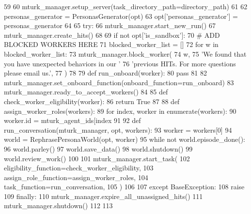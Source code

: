 \begin{DoxyCode}
59 
60     mturk\_manager.setup\_server(task\_directory\_path=directory\_path)
61 
62     personas\_generator = PersonasGenerator(opt)
63     opt[\textcolor{stringliteral}{'personas\_generator'}] = personas\_generator
64 
65     \textcolor{keywordflow}{try}:
66         mturk\_manager.start\_new\_run()
67         mturk\_manager.create\_hits()
68 
69         \textcolor{keywordflow}{if} \textcolor{keywordflow}{not} opt[\textcolor{stringliteral}{'is\_sandbox'}]:
70             \textcolor{comment}{# ADD BLOCKED WORKERS HERE}
71             blocked\_worker\_list = []
72             \textcolor{keywordflow}{for} w \textcolor{keywordflow}{in} blocked\_worker\_list:
73                 mturk\_manager.block\_worker(
74                     w,
75                     \textcolor{stringliteral}{'We found that you have unexpected behaviors in our '}
76                     \textcolor{stringliteral}{'previous HITs. For more questions please email us.'},
77                 )
78 
79         \textcolor{keyword}{def }run\_onboard(worker):
80             \textcolor{keywordflow}{pass}
81 
82         mturk\_manager.set\_onboard\_function(onboard\_function=run\_onboard)
83         mturk\_manager.ready\_to\_accept\_workers()
84 
85         \textcolor{keyword}{def }check\_worker\_eligibility(worker):
86             \textcolor{keywordflow}{return} \textcolor{keyword}{True}
87 
88         \textcolor{keyword}{def }assign\_worker\_roles(workers):
89             \textcolor{keywordflow}{for} index, worker \textcolor{keywordflow}{in} enumerate(workers):
90                 worker.id = mturk\_agent\_ids[index %
91 
92         \textcolor{keyword}{def }run\_conversation(mturk\_manager, opt, workers):
93             worker = workers[0]
94             world = RephrasePersonaWorld(opt, worker)
95             \textcolor{keywordflow}{while} \textcolor{keywordflow}{not} world.episode\_done():
96                 world.parley()
97             world.save\_data()
98             world.shutdown()
99             world.review\_work()
100 
101         mturk\_manager.start\_task(
102             eligibility\_function=check\_worker\_eligibility,
103             assign\_role\_function=assign\_worker\_roles,
104             task\_function=run\_conversation,
105         )
106 
107     \textcolor{keywordflow}{except} BaseException:
108         \textcolor{keywordflow}{raise}
109     \textcolor{keywordflow}{finally}:
110         mturk\_manager.expire\_all\_unassigned\_hits()
111         mturk\_manager.shutdown()
112 
113 
\end{DoxyCode}

